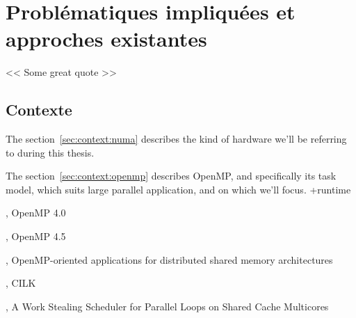 \part{Problématiques impliquées et approches existantes}

\begin{savequote}[6cm]
<< Some great quote  >>
\end{savequote}
\chapter{Contexte}
\chaptertoc

The section~\ref{sec:context:numa} describes the kind of hardware we'll be referring to during this thesis.

The section~\ref{sec:context:openmp} describes OpenMP, and specifically its task model, which suits large parallel application, and on which we'll focus.
+runtime







\cite{openmp40}, OpenMP 4.0

\cite{openmp45}, OpenMP 4.5

\cite{Marowka2004}, OpenMP-oriented applications for distributed shared memory architectures

\cite{cilk5}, CILK

\cite{Tchiboukdjian2010}, A Work Stealing Scheduler for Parallel Loops on Shared Cache Multicores

